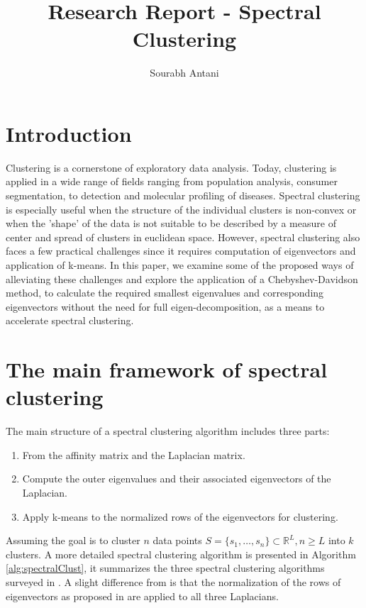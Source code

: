 \documentclass[10pt,a4paper, nocenter]{article}
\author{Sourabh Antani}
\title{Research Report - Spectral Clustering}
\date{}
\begin{document}
	\maketitle
	
	\section{Introduction}
    \thispagestyle{fancy}
    Clustering is a cornerstone of exploratory data analysis. Today, clustering is applied in a wide range of fields ranging from population analysis, consumer segmentation, to detection and molecular profiling of diseases. Spectral clustering is especially useful when the structure of the individual clusters is non-convex or when the 'shape' of the data is not suitable to be described by a measure of center and spread of clusters in euclidean space. However, spectral clustering also faces a few practical challenges since it requires computation of eigenvectors and application of k-means. In this paper, we examine some of the proposed ways of alleviating these challenges and explore the application of a Chebyshev-Davidson method, to calculate the required smallest eigenvalues and corresponding eigenvectors without the need for full eigen-decomposition, as a means to accelerate spectral clustering.

    \section{The main framework of spectral clustering}
    The main structure of a spectral clustering algorithm includes three parts:
    \begin{enumerate}
   		\item From the affinity matrix and the Laplacian matrix.
    	\item Compute the outer eigenvalues and their associated eigenvectors of the Laplacian.
    	\item Apply k-means to the normalized rows of the eigenvectors for clustering.
    \end{enumerate}
    
	 Assuming the goal is to cluster $n$ data points $S=\{s_1,\dots,s_n\} \subset \mathbb{R}^L, n\ge L$ into $k$ clusters. A more detailed spectral clustering algorithm is presented in Algorithm \ref{alg:spectralClust}, it summarizes the three spectral clustering algorithms surveyed in \cite{Luxburg2007}. A slight difference from \cite{Luxburg2007} is that the normalization of the rows of eigenvectors as proposed in \cite{ng-jordan-01} are applied to all three Laplacians.
    
\end{document}
